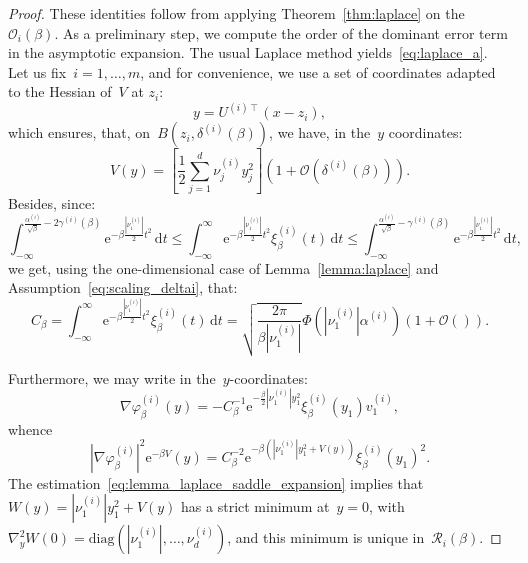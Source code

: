 \documentclass[10pt]{article}
\renewcommand{\d}{\mathrm{d}}
\newcommand{\e}{\mathrm{e}}
\newcommand{\1}{\mathbbm 1}
\newcommand{\deltaRadius}[1]{\delta^{(#1)}} %
\newcommand{\epsLimit}[1]{\alpha^{(#1)}} %
\newcommand{\localNeighborhood}[2][]{\mathcal{O}_{#2}^{#1}} %
\newcommand{\gammaPerturbation}[1]{\gamma^{(#1)}}
\newcommand{\localCuboid}[1]{\mathcal R_{#1}}
\newcommand{\hessPassage}[2][]{U^{(#2)#1}} %
\newcommand{\hessEigvec}[2]{v^{(#1)}_{#2}} %
\newcommand{\hessEigval}[2]{\nu^{(#1)}_{#2}} %
\newcommand{\fineCutoff}[1]{\xi_\beta^{(#1)}}
\renewcommand{\O}{\mathcal{O}}
\begin{document}
        \begin{proof}
            These identities follow from applying Theorem~\ref{thm:laplace} on the~$\localNeighborhood[]{i}(\beta)$. As a preliminary step, we compute the order of the dominant error term in the asymptotic expansion.
            The usual Laplace method yields~\eqref{eq:laplace_a}.
            Let us fix~$i=1,\dots,m$, and for convenience, we use a set of coordinates adapted to the Hessian of~$V$ at $z_i$:
            \[y = \hessPassage[\intercal]{i}(x-z_i),\]
            which ensures, that, on~$B(z_i,\deltaRadius{i}(\beta))$, we have, in the~$y$ coordinates:
            \begin{equation}
                \label{eq:lemma_laplace_saddle_expansion}
                V(y) =\left[\frac12\sum_{j=1}^d \hessEigval{i}{j}y_j^2\right]\left(1+\O(\deltaRadius{i}(\beta))\right).
            \end{equation}
            Besides, since:
            \begin{equation}
                \label{eq:lemma_laplace_tmp}
            \int_{-\infty}^{\frac{\epsLimit{i}}{\sqrt\beta}-2\gammaPerturbation{i}(\beta)}\e^{-\beta \frac{|\hessEigval{i}{1}|}{2}t^2}\,\d t\leq \int_{-\infty}^\infty \e^{-\beta \frac{|\hessEigval{i}{1}|}{2}t^2} \fineCutoff{i}(t)\,\d t \leq \int_{-\infty}^{\frac{\epsLimit{i}}{\sqrt\beta}-\gammaPerturbation{i}(\beta)} \e^{-\beta \frac{|\hessEigval{i}{1}|}{2}t^2}\,\d t,
            \end{equation}
            we get, using the one-dimensional case of Lemma~\ref{lemma:laplace} and Assumption~\eqref{eq:scaling_deltai}, that:
            \begin{equation}
                \label{eq:lemma_laplace_d_beta_estimation}
                C_\beta = \int_{-\infty}^\infty \e^{-\beta \frac{|\hessEigval{i}{1}|}{2}t^2} \fineCutoff{i}(t)\,\d t = \sqrt{\frac{2\pi}{\beta|\hessEigval{i}{1}|}}\Phi(|\hessEigval{i}{1}|\epsLimit{i})\left(1+\O()\right).
            \end{equation}

            Furthermore, we may write in the~$y$-coordinates:
            \[\nabla \varphi_\beta^{(i)}(y) = -C_\beta^{-1}\e^{-\frac{\beta}2|\hessEigval{i}{1}|y_1^2}\fineCutoff{i}(y_1)\hessEigvec{i}{1},\]
            whence
            \[|\nabla\varphi_\beta^{(i)}|^2\e^{-\beta V}(y) = C_\beta^{-2}\e^{-\beta\left(|\hessEigval{i}{1}|y_1^2+ V(y)\right)}\fineCutoff{i}(y_1)^2.\]
            The estimation~\eqref{eq:lemma_laplace_saddle_expansion} implies that~$W(y)=|\hessEigval{i}{1}|y_1^2+ V(y)$ has a strict minimum at~$y=0$, with~$\nabla_y^2 W(0) = \mathrm{diag}\left(|\hessEigval{i}{1}|,\dots, \hessEigval{i}{d}\right)$, and this minimum is unique in~$\localCuboid{i}(\beta)$.


\end{proof}
\end{document}
